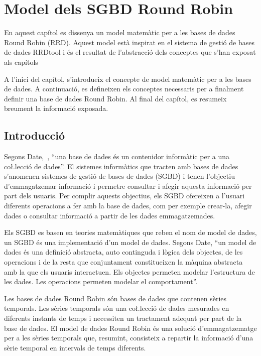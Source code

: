 \chapter[Model RRD]{Model dels SGBD Round Robin}\label{cap:model-rrd}

En aquest capítol es dissenya un model matemàtic per a les bases de dades Round Robin (RRD). Aquest model està inspirat en el sistema de gestió de bases de dades RRDtool i és el resultat de l'abstracció dels conceptes que s'han exposat als capítols %

A l'inici del capítol, s'introdueix el concepte de model matemàtic per a les bases de dades. 
A continuació, es defineixen els conceptes necessaris per a finalment definir una base de dades Round Robin. 
Al final del capítol, es resumeix breument la informació exposada.

  

\section{Introducció}

Segons Date,~\cite{Date}, ``una base de dades és un contenidor informàtic per a una co\l.lecció de dades''. El sistemes informàtics que tracten amb bases de dades s'anomenen sistemes de gestió de bases de dades (SGBD) i tenen l'objectiu d'emmagatzemar informació i permetre consultar i afegir aquesta informació  per part dels usuaris.
Per complir aquests objectius, els SGBD ofereixen a l'usuari diferents operacions a fer amb la base de dades, com per exemple crear-la, afegir dades o consultar informació a partir de les dades emmagatzemades.

Els SGBD es basen en teories matemàtiques que reben el nom de model de dades, un SGBD és una implementació d'un model de dades.
Segons Date, ``un model de dades és una definició abstracta, auto continguda i lògica dels objectes, de les operacions i  de la resta que conjuntament constitueixen la màquina abstracta amb la que els usuaris interactuen. Els objectes permeten modelar l'estructura de les dades. Les operacions permeten modelar el comportament''.

Les bases de dades Round Robin són bases de dades que contenen sèries temporals. Les sèries temporals són una co\l.lecció de dades mesurades en diferents instants de temps i necessiten un tractament adequat per part de la base de dades. 
El model de dades Round Robin és una solució d'emmagatzematge per a les sèries temporals que, resumint, consisteix a repartir la informació d'una sèrie temporal en intervals de temps diferents.

